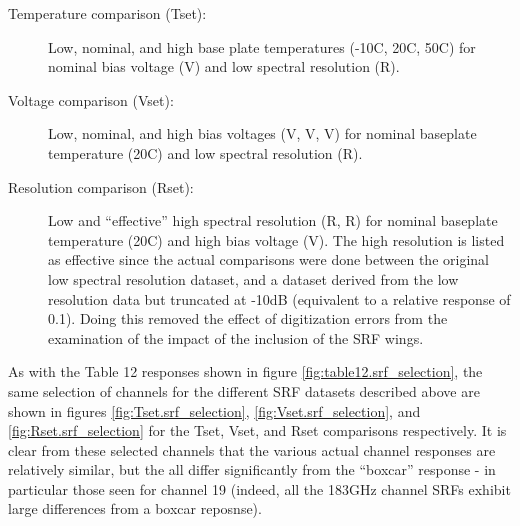 \begin{description}
  \item[Temperature comparison (Tset):] Low, nominal, and high base plate temperatures (-10\textdegree{}C, 20\textdegree{}C, 50\textdegree{}C) for nominal bias voltage (V) and low spectral resolution (R).
  \item[Voltage comparison (Vset):] Low, nominal, and high bias voltages (V, V, V) for nominal baseplate temperature (20\textdegree{}C) and low spectral resolution (R).
  \item[Resolution comparison (Rset):] Low and ``effective'' high spectral resolution (R, R) for nominal baseplate temperature (20\textdegree{}C) and high bias voltage (V). The high resolution  is listed as effective since the actual comparisons were done between the original low spectral resolution dataset, and a dataset derived from the low resolution data but truncated at -10dB (equivalent to a relative response of 0.1). Doing this removed the effect of digitization errors from the examination of the impact of the inclusion of the SRF wings.
\end{description}

As with the Table 12 responses shown in figure \ref{fig:table12.srf_selection}, the same selection of channels for the different SRF datasets described above are shown in figures \ref{fig:Tset.srf_selection},  \ref{fig:Vset.srf_selection}, and \ref{fig:Rset.srf_selection} for the Tset, Vset, and Rset comparisons respectively. It is clear from these selected channels that the various actual channel responses are relatively similar, but the all differ significantly from the ``boxcar'' response - in particular those seen for channel 19 (indeed, all the 183GHz channel SRFs exhibit large differences from a boxcar reposnse).

